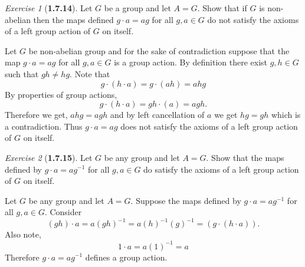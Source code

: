 \documentclass[12pt]{amsart}
\makeatletter
\theoremstyle{remark}
\newtheorem*{exercise}{Exercise}%
\renewenvironment{proof}[1][\proofname]{\par\doublespacing
  \pushQED{\qed}%
  \normalfont \topsep6\p@\@plus6\p@\relax
  \list{}{%
    \settowidth{\leftmargin}{\itshape\proofname:\hskip\labelsep}%
    \setlength{\labelwidth}{0pt}%
    \setlength{\itemindent}{-\leftmargin}%
  }%
  \item[\hskip\labelsep\itshape#1\@addpunct{:}]\ignorespaces
}{%
  \popQED\endlist\@endpefalse
  \singlespacing
}
\theoremstyle{mycomment}
\makeatother
\begin{document}
\begin{exercise}[\textbf{1.7.14}] Let $G$ be a group and let $A = G$. Show that if $G$ is non-abelian then the maps defined 
  $g \cdot a = ag$ for all $g, a \in G$ do not satisfy the axioms of a left group action of $G$ on itself.\\
  \begin{proof} Let $G$ be non-abelian group and for the sake of contradiction suppose that the map $g \cdot a = ag$ for all $g, a \in G$ is a group action.
    By definition there exist $g, h \in G$ such that $gh \neq hg$. Note that 
    \begin{equation*}
      g \cdot (h \cdot a) = g \cdot (ah) = ahg 
    \end{equation*}
    By properties of group actions,
    \begin{equation*}
      g \cdot (h \cdot a) =   gh\cdot(a) = agh.
    \end{equation*}
    Therefore we get, $ahg = agh$ and by left cancellation of $a$ we get $hg = gh$ which is a contradiction. Thus $g \cdot a = ag$ does not satisfy the axioms of a left group action of $G$ on itself.
  \end{proof}
\end{exercise}
\vspace{.15in}

\begin{exercise}[\textbf{1.7.15}] Let $G$ be any group and let $A = G$. Show that the maps defined by $g \cdot a = ag^{-1}$ for all $g, a \in G$
  do satisfy the axioms of a left group action of $G$ on itself.\\
  \begin{proof} Let $G$ be any group and let $A = G$. Suppose the maps defined by $g \cdot a = ag^{-1}$ for all $g, a \in G$. Consider 
    \begin{equation*}
      (gh) \cdot a = a(gh)^{-1} = a(h)^{-1}(g)^{-1} = (g\cdot(h \cdot a)). 
    \end{equation*}
    Also note, 
    \begin{equation*}
      1 \cdot a = a (1)^{-1} = a
    \end{equation*}
    Therefore $g \cdot a = ag^{-1}$  defines a group action. 
  \end{proof}
\end{exercise}
\vspace{.15in}
\end{document}

